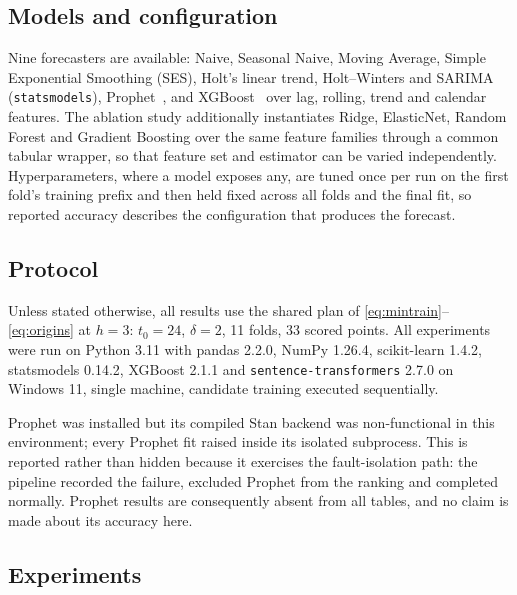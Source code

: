 \documentclass[conference]{IEEEtran}
\begin{document}
\subsection{Models and configuration}

Nine forecasters are available: Naive, Seasonal Naive, Moving Average, Simple
Exponential Smoothing (SES), Holt's linear trend, Holt--Winters and SARIMA
(\texttt{statsmodels}), Prophet~\cite{taylor2018prophet}, and
XGBoost~\cite{chen2016xgboost} over lag, rolling, trend and calendar features.
The ablation study additionally instantiates Ridge, ElasticNet, Random Forest
and Gradient Boosting over the same feature families through a common tabular
wrapper, so that feature set and estimator can be varied independently.
Hyperparameters, where a model exposes any, are tuned once per run on the
first fold's training prefix and then held fixed across all folds and the
final fit, so reported accuracy describes the configuration that produces the
forecast.

\subsection{Protocol}

Unless stated otherwise, all results use the shared plan of
\eqref{eq:mintrain}--\eqref{eq:origins} at $h=3$: $t_0=24$, $\delta=2$,
11 folds, 33 scored points. All experiments were run on Python 3.11 with
pandas 2.2.0, NumPy 1.26.4, scikit-learn 1.4.2, statsmodels 0.14.2, XGBoost
2.1.1 and \texttt{sentence-transformers} 2.7.0 on Windows 11, single machine,
candidate training executed sequentially.

Prophet was installed but its compiled Stan backend was non-functional in this
environment; every Prophet fit raised inside its isolated subprocess. This is
reported rather than hidden because it exercises the fault-isolation path: the
pipeline recorded the failure, excluded Prophet from the ranking and completed
normally. Prophet results are consequently absent from all tables, and no
claim is made about its accuracy here.

\subsection{Experiments}
\end{document}
